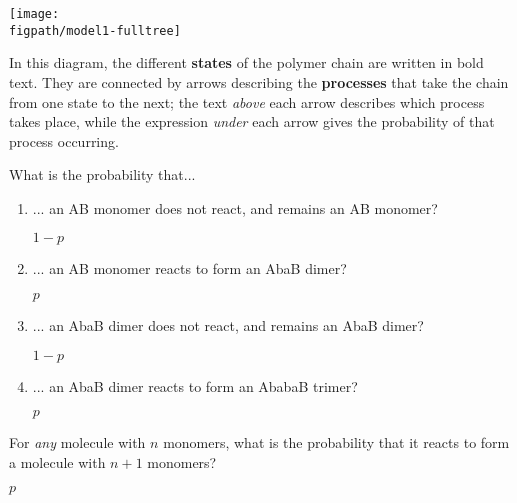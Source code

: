 \begin{activity}
\begin{model}
\vspace{0.1in}
\centerline{\texttt{[image: \\figpath/model1-fulltree]}}

In this diagram, the different \textbf{states} of the polymer chain are written in bold text.  They are connected by arrows describing the \textbf{processes} that take the chain from one state to the next; the text \emph{above} each arrow describes which process takes place, while the expression \emph{under} each arrow gives the probability of that process occurring.

\end{model}

\vspace{0.05in}
\begin{ctqs}
	
	\question What is the probability that...
	
		\begin{enumerate}
			\item ... an AB monomer does not react, and remains an AB monomer?
	
			\begin{solution}[0.25in]
				$1-p$
			\end{solution}

		\item ... an AB monomer reacts to form an AbaB dimer?
	
			\begin{solution}[0.25in]
				$p$
			\end{solution}
		
		\item ... an AbaB dimer does not react, and remains an AbaB dimer?
	
			\begin{solution}[0.25in]
				$1-p$
			\end{solution}
	
		
		\item ... an AbaB dimer reacts to form an AbabaB trimer?
	
			\begin{solution}[0.25in]
				$p$
			\end{solution}
			
		\end{enumerate}	
		
	\question For \emph{any} molecule with $n$ monomers, what is the probability that it reacts to form a molecule with $n+1$ monomers?
	
			\begin{solution}[0.25in]
				$p$
			\end{solution}
	

\end{ctqs}
\end{activity}
